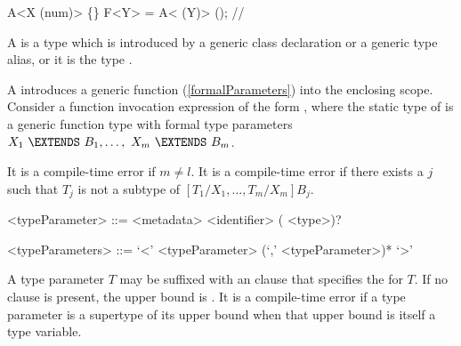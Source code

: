 \documentclass[makeidx]{article}
\begin{document}

\begin{dartCode}
\CLASS{} A<X \EXTENDS{} \VOID{} \FUNCTION(num)> \{\}
\TYPEDEF{} F<Y> = A<\VOID{} \FUNCTION(Y)> \FUNCTION(); // 
\end{dartCode}


\LMHash{}%
A  is a type which is introduced by
a generic class declaration or a generic type alias,
or it is the type .

\LMHash{}%
A 
introduces a generic function (\ref{formalParameters}) into the enclosing scope.
Consider a function invocation expression of the form
,
where the static type of  is a generic function type with formal type parameters
$X_1\ \EXTENDS\ B_1, \ldots,\ X_m\ \EXTENDS\ B_m$.

\LMHash{}%
It is a compile-time error if $m \not= l$.
It is a compile-time error if there exists a $j$
such that $T_j$ is not a subtype of $[T_1/X_1, \ldots, T_m/X_m]B_j$.


\begin{grammar}
<typeParameter> ::= <metadata> <identifier> (\EXTENDS{} <type>)?

<typeParameters> ::= `<' <typeParameter> (`,' <typeParameter>)* `>'
\end{grammar}

\LMHash{}%
A type parameter $T$ may be suffixed with an \EXTENDS{} clause that specifies the  for $T$.
If no \EXTENDS{} clause is present, the upper bound is .
It is a compile-time error if a type parameter is a supertype of its upper bound
when that upper bound is itself a type variable.
\end{document}

